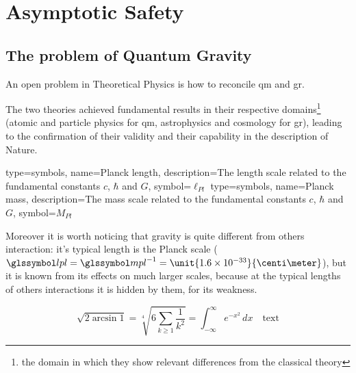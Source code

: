 
\chapter{Asymptotic Safety}
\label{cap:AsSty}
\label{cap:assty}
\minitoc
\adjustmtc

\section{The problem of Quantum Gravity}
\label{sec:problemQG}


An open problem in Theoretical Physics is how to reconcile \acrfull{qm} and \acrfull{gr}.

The two theories achieved fundamental results in their respective domains\footnote{the domain in which they show relevant differences from the classical theory} (atomic and particle physics for \acrshort{qm}, astrophysics and cosmology for \acrshort{gr}), leading to the confirmation of their validity and their capability in the description of Nature.
\newline

{
	type=symbols,
	name={Planck length},
	description={The length scale related to the fundamental constants $ c $, $ \hbar $ and $ G $},
	symbol={\ensuremath{\ell_{Pl}}}
}
{
	type=symbols,
	name={Planck mass},
	description={The mass scale related to the fundamental constants $ c $, $ \hbar $ and $ G $},
	symbol={\ensuremath{M_{Pl}}}
}

Moreover it is worth noticing that gravity is quite different from others interaction: it's typical length is the Planck scale ($ \gsym{lpl} = \gsym{mpl}^{-1} = \unit{1.6 \times 10^{-33}}{\centi\meter} $), but it is known from its effects on much larger scales, because at the typical lengths of others interactions it is hidden by them, for its weakness.


\begin{equation}
	\sqrt{2\arcsin 1}=\sqrt[4]{6\sum_{k\ge1}\frac{1}{k^{2}}}=
	\int_{-\infty}^{\infty}e^{-x^{2}}\,dx \quad\text{text}
\end{equation}



